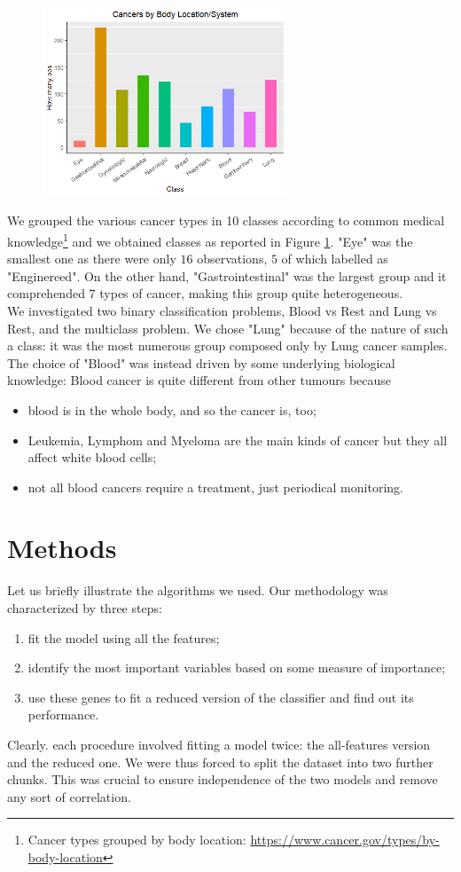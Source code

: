 \documentclass[a4paper,11pt, oneside]{article}  %
\begin{document}
\begin{figure}
	\includegraphics[width=0.65\textwidth]{plot1.png}
	\label{fig1}
\end{figure}
We grouped the various cancer types in 10 classes according to common medical knowledge\footnote{Cancer types grouped by body location: \url{https://www.cancer.gov/types/by-body-location}} and we obtained classes as reported in Figure \ref{fig1}.  "Eye" was the smallest one as there were only $16$ observations, $5$ of which labelled as "Enginereed". On the other hand, "Gastrointestinal" was the largest group and it comprehended $7$ types of cancer,  making this group quite heterogeneous. \\
We investigated two binary classification problems, Blood vs Rest and Lung vs Rest, and the multiclass problem. We chose "Lung" because of the nature of such a class: it was the most numerous group composed only by Lung cancer samples. The choice of "Blood" was instead driven by some underlying biological knowledge: Blood cancer is quite different from other tumours because
\begin{itemize}
	\item blood is in the whole body, and so the cancer is, too;
	\item Leukemia, Lymphom and Myeloma are the main kinds of cancer but they all affect white blood cells;
	\item not all blood cancers require a treatment, just periodical monitoring.
\end{itemize} 


\section{Methods}
Let us briefly illustrate the algorithms we used. Our methodology was characterized by three steps:
\begin{enumerate}
	\item fit the model using all the features;
	\item identify the most important variables based on some measure of importance;
	\item use these genes to fit a reduced version of the classifier and find out its performance.
\end{enumerate}
Clearly. each procedure involved fitting a model twice: the all-features version and the reduced one. We were thus forced to split the dataset into two further chunks. This was crucial to ensure independence of the two models and remove any sort of correlation.
\end{document}
